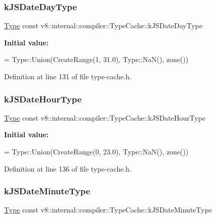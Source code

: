 \subsubsection{\texorpdfstring{k\+J\+S\+Date\+Day\+Type}{kJSDateDayType}}
{\footnotesize\ttfamily \mbox{\hyperlink{classv8_1_1internal_1_1compiler_1_1Type}{Type}} const v8\+::internal\+::compiler\+::\+Type\+Cache\+::k\+J\+S\+Date\+Day\+Type}

{\bfseries Initial value\+:}
\begin{DoxyCode}
=
      Type::Union(CreateRange(1, 31.0), Type::NaN(), zone())
\end{DoxyCode}


Definition at line 131 of file type-\/cache.\+h.

\mbox{\label{classv8_1_1internal_1_1compiler_1_1TypeCache_ade1b82b95e8af3e24cecacdfa3dbe69b}} 
\subsubsection{\texorpdfstring{k\+J\+S\+Date\+Hour\+Type}{kJSDateHourType}}
{\footnotesize\ttfamily \mbox{\hyperlink{classv8_1_1internal_1_1compiler_1_1Type}{Type}} const v8\+::internal\+::compiler\+::\+Type\+Cache\+::k\+J\+S\+Date\+Hour\+Type}

{\bfseries Initial value\+:}
\begin{DoxyCode}
=
      Type::Union(CreateRange(0, 23.0), Type::NaN(), zone())
\end{DoxyCode}


Definition at line 136 of file type-\/cache.\+h.

\mbox{\label{classv8_1_1internal_1_1compiler_1_1TypeCache_a94dfb02fb78dc965ec887db64a29803c}} 
\subsubsection{\texorpdfstring{k\+J\+S\+Date\+Minute\+Type}{kJSDateMinuteType}}
{\footnotesize\ttfamily \mbox{\hyperlink{classv8_1_1internal_1_1compiler_1_1Type}{Type}} const v8\+::internal\+::compiler\+::\+Type\+Cache\+::k\+J\+S\+Date\+Minute\+Type}

